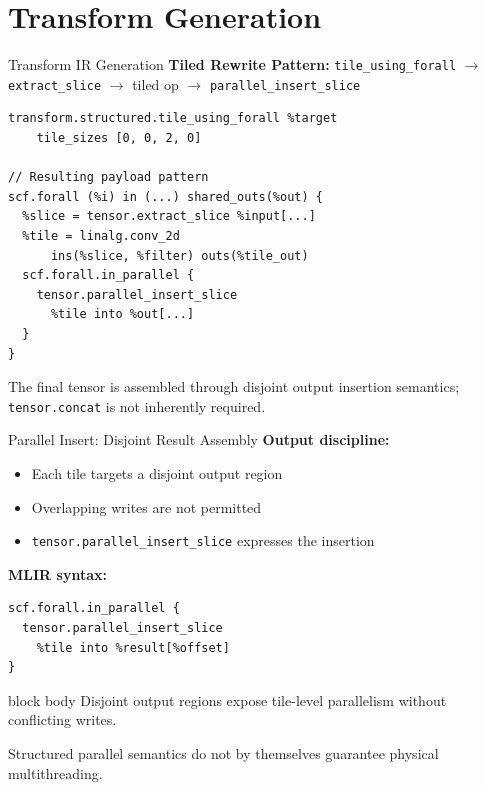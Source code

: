 \documentclass[10pt,aspectratio=169]{beamer}
\begin{document}
\section{Transform Generation}
\begin{frame}[fragile]{Transform IR Generation}
\centering
\textbf{Tiled Rewrite Pattern:} \texttt{tile\_using\_forall} $\rightarrow$ \texttt{extract\_slice} $\rightarrow$ tiled op $\rightarrow$ \texttt{parallel\_insert\_slice}

\vspace{0.08cm}
\scriptsize
\begin{verbatim}
transform.structured.tile_using_forall %target
    tile_sizes [0, 0, 2, 0]

// Resulting payload pattern
scf.forall (%i) in (...) shared_outs(%out) {
  %slice = tensor.extract_slice %input[...]
  %tile = linalg.conv_2d
      ins(%slice, %filter) outs(%tile_out)
  scf.forall.in_parallel {
    tensor.parallel_insert_slice
      %tile into %out[...]
  }
}
\end{verbatim}

\vspace{-0.15cm}
\footnotesize The final tensor is assembled through disjoint output insertion semantics; \texttt{tensor.concat} is not inherently required.
\end{frame}

\begin{frame}[fragile]{Parallel Insert: Disjoint Result Assembly}
\textbf{Output discipline:}
\begin{itemize}
\small
\item Each tile targets a disjoint output region
\item Overlapping writes are not permitted
\item \texttt{tensor.parallel\_insert\_slice} expresses the insertion
\end{itemize}

\vspace{0.25cm}
\textbf{MLIR syntax:}
\small
\begin{verbatim}
scf.forall.in_parallel {
  tensor.parallel_insert_slice
    %tile into %result[%offset]
}
\end{verbatim}

\begin{beamercolorbox}[sep=0.3em,center,rounded=true,shadow=true]{block body}
\small
Disjoint output regions expose tile-level parallelism without conflicting writes.
\end{beamercolorbox}

\vspace{0.25cm}
\small Structured parallel semantics do not by themselves guarantee physical multithreading.
\end{frame}
\end{document}
